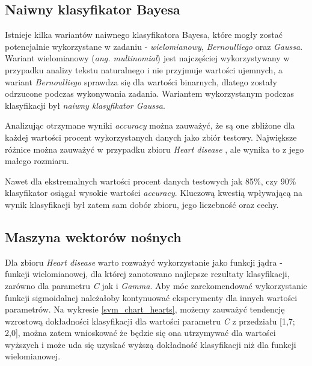\documentclass{classrep}
\begin{document}
{        \subsection{Naiwny klasyfikator Bayesa}
        \label{bayes_summary} {
            Istnieje kilka wariantów naiwnego klasyfikatora Bayesa, które mogły zostać
            potencjalnie wykorzystane w zadaniu - \textit{wielomianowy},
            \textit{Bernoulliego} oraz \textit{Gaussa}.
            Wariant wielomianowy (\textit{ang. multinomial}) jest najczęściej
            wykorzystywany w przypadku analizy tekstu naturalnego i nie przyjmuje
            wartości ujemnych, a wariant \textit{Bernoulliego} sprawdza się dla
            wartości binarnych, dlatego zostały odrzucone podczas wykonywania zadania.
            Wariantem wykorzystanym podczas klasyfikacji był \textit{naiwny
            klasyfikator Gaussa}.

            Analizując otrzymane wyniki \textit{accuracy} można zauważyć, że są one
            zbliżone dla każdej wartości procent wykorzystanych danych jako zbiór
            testowy. Największe różnice można zauważyć w przypadku zbioru \textit{Heart
            disease} \cite{dataset_heart}, ale wynika to z jego małego rozmiaru.

            Nawet dla ekstremalnych wartości procent danych testowych jak 85\%, czy
            90\% klasyfikator osiągał wysokie wartości \textit{accuracy}. Kluczową
            kwestią wpływającą na wynik klasyfikacji był zatem sam dobór zbioru, jego
            liczebność oraz cechy.
        }

        \subsection{Maszyna wektorów nośnych}
        \label{svm_summary} {
            Dla zbioru \textit{Heart disease} \cite{dataset_heart} warto rozważyć
            wykorzystanie jako funkcji jądra - funkcji wielomianowej, dla której
            zanotowano najlepsze rezultaty klasyfikacji, zarówno dla parametru \emph{C}
            jak i \emph{Gamma}. Aby móc zarekomendować wykorzystanie funkcji
            sigmoidalnej należałoby kontynuować eksperymenty dla innych wartości
            parametrów. Na wykresie \ref{svm_chart_hearts}, możemy zauważyć tendencję
            wzrostową dokładności klasyfikacji dla wartości parametru \emph{C} z
            przedziału [1,7; 2,0], można zatem wnioskować że będzie się ona utrzymywać
            dla wartości wyższych i może uda się uzyskać wyższą dokładność klasyfikacji
            niż dla funkcji wielomianowej.

}}
\end{document}
